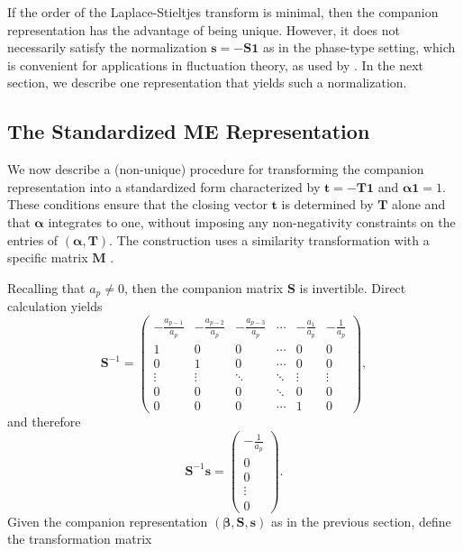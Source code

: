 \documentclass[a4paper,11pt]{article}
\numberwithin{equation}{section}
\theoremstyle{plain}
\theoremstyle{definition}
\newcommand{\1}{\mathbf{1}}
\begin{document}
If the order of the Laplace-Stieltjes transform is minimal, then the companion representation has the advantage of being unique.
However, it does not necessarily satisfy the normalization  $\bm{s} = -\bm{S}\bm{1}$ as in the phase-type setting, which is convenient for applications in fluctuation theory, as used by \cite{Ivanovs2021}.
In the next section, we describe one representation that yields such a normalization.

\subsection{The Standardized ME Representation}

We now describe a (non-unique) procedure for transforming the companion representation into a standardized form characterized by $\bm{t} = -\bm{T}\bm{1}$ and $\bm{\alpha}\bm{1} = 1$. These conditions ensure that the closing vector $\bm{t}$ is determined by $\bm{T}$ alone and that $\bm{\alpha}$ integrates to one, without imposing any non-negativity constraints on the entries of $(\bm{\alpha}, \bm{T})$. The construction uses a similarity transformation with a specific matrix $\bm{M}$ \citep{asmussen1996renewal}.

Recalling that $a_p \neq 0$, then the companion matrix $\bm{S}$ is invertible. Direct calculation yields
\begin{equation}\label{eq:S_inverse}
\bm{S}^{-1} = \begin{pmatrix}
-\frac{a_{p-1}}{a_p} & -\frac{a_{p-2}}{a_p} & -\frac{a_{p-3}}{a_p} & \cdots & -\frac{a_1}{a_p} & -\frac{1}{a_p} \\
1 & 0 & 0 & \cdots & 0 & 0 \\
0 & 1 & 0 & \cdots & 0 & 0 \\
\vdots & \vdots & \ddots & \ddots & \vdots & \vdots \\
0 & 0 & 0 & \ddots & 0 & 0\\
0 & 0 & 0 & \cdots & 1 & 0
\end{pmatrix},
\end{equation}
and therefore
\begin{equation}\label{eq:S_inverse_s}
\bm{S}^{-1}\bm{s} = \begin{pmatrix}
-\frac{1}{a_p} \\
0 \\
0 \\
\vdots \\
0
\end{pmatrix}.
\end{equation}
Given the companion representation $(\bm{\beta}, \bm{S}, \bm{s})$ as in the previous section, define the transformation matrix
\end{document}
